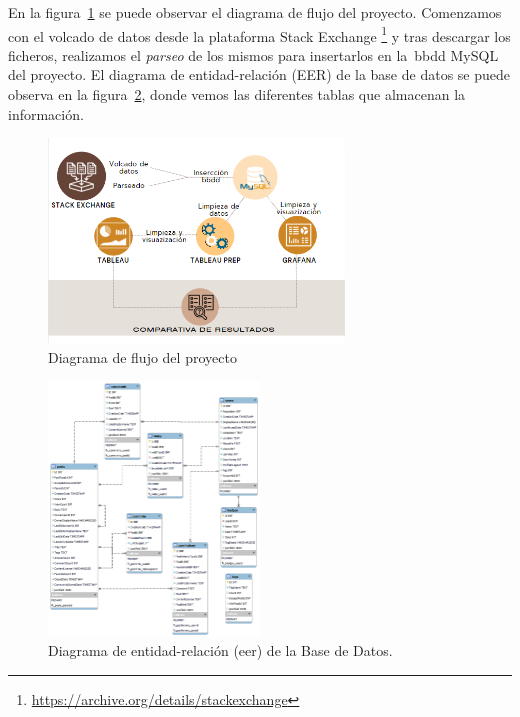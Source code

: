 \documentclass[a4paper, 12pt]{book}
\begin{document}
En la figura~\ref{fig:_arquitectura} se puede observar el diagrama de flujo del proyecto. Comenzamos con el volcado de datos desde la plataforma Stack Exchange \footnote{\url{https://archive.org/details/stackexchange}} y tras descargar los ficheros, realizamos el \emph{parseo} de los mismos para insertarlos en la~\gls{bbdd} MySQL del proyecto. El diagrama de entidad-relación (EER) de la base de datos se puede observa en la figura~\ref{fig:modelo_entidad_relacion}, donde vemos las diferentes tablas que almacenan la información.   
\begin{figure}
    \centering
    \includegraphics[width=0.7\textwidth, keepaspectratio]{img/flujo_arquitectura.png}
    \caption{Diagrama de flujo del proyecto}\label{fig:_arquitectura}
\end{figure}

\begin{figure}
  \centering
  \includegraphics[width=0.5\textwidth, keepaspectratio]{img/modelo_entidad_relacion.png}
  \caption{Diagrama de entidad-relación (\gls{eer}) de la Base de Datos.}\label{fig:modelo_entidad_relacion}
\end{figure}
\end{document}
